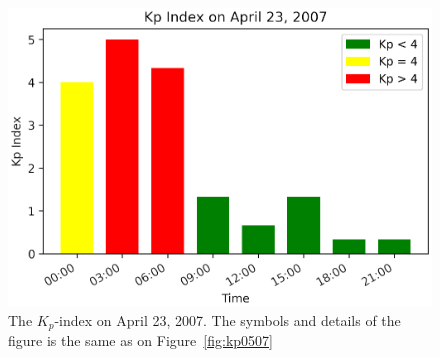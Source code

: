 \documentclass[draft]{agujournal2019}
\begin{document}
\pagebreak

\begin{figure}[!t]
\centering
\includegraphics[width=1.\textwidth]{jgr-2023-ipshocks-f30.eps}
\caption{The $K_{p}$-index on April 23, 2007. The symbols and details of the figure is the same as on Figure~\ref{fig:kp0507}}
\label{fig:kp0423}
\end{figure}
\end{document}
